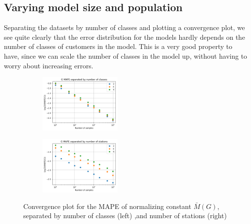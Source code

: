 \subsection{Varying model size and population}

Separating the datasets by number of classes and plotting a convergence plot, we see quite clearly that the error distribution for the models hardly depends on the number of classes of customers in the model. This is a very good property to have, since we can scale the number of classes in the model up, without having to worry about increasing errors.

\begin{figure}[!htb]
\begin{center}
\begin{subfigure}
    \centering
    \includegraphics[width=0.45\textwidth]{Chap6_EvaluationAndAnalysis/images/ConvergenceNumberOfClasses_SM_meanerr.png}
\end{subfigure}
\begin{subfigure}
    \centering
    \includegraphics[width=0.45\textwidth]{Chap6_EvaluationAndAnalysis/images/ConvergenceNumberOfStations_SM_meanerr.png}
\end{subfigure}
\caption{Convergence plot for the MAPE of normalizing constant \(\bar{M}(G)\), separated by number of classes (left) ,and number of stations (right)}
\label{fig:ClassSeparatedConvergence_MAPE}
\end{center}
\end{figure}

